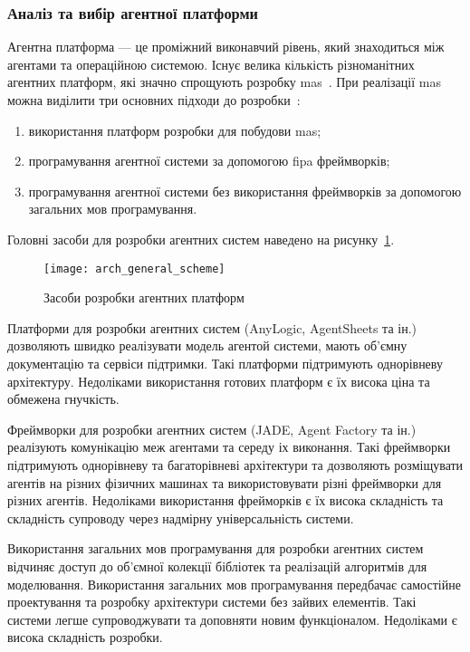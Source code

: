 \subsubsection{Аналіз та вибір агентної платформи}
Агентна платформа --- це проміжний виконавчий рівень, який знаходиться між агентами та операційною системою.
Існує велика кількість різноманітних агентних платформ, які значно спрощують розробку \acrshort{mas}~\cite{Kravari2015}.
При реалізації \acrshort{mas} можна виділити три основних підходи до розробки~\cite{Zhou2010}:
\begin{enumerate}[label={\arabic*)}]
	\item використання платформ розробки для побудови \acrshort{mas};
	\item програмування агентної системи за допомогою \acrshort{fipa} фреймворків;
	\item програмування агентної системи без використання фреймворків за допомогою загальних мов програмування.
\end{enumerate}

Головні засоби для розробки агентних систем наведено на рисунку~\ref{fig:arch_general_scheme}.

\begin{figure}[H]
	\centering
	\texttt{[image: arch\_general\_scheme]}
	\caption{Засоби розробки агентних платформ}
	\label{fig:arch_general_scheme}
\end{figure} 


Платформи для розробки агентних систем (AnyLogic, AgentSheets та ін.) дозволяють швидко реалізувати модель агентой системи, мають об'ємну документацію та сервіси підтримки. Такі платформи підтримують однорівневу архітектуру. Недоліками використання готових платформ є їх висока ціна та обмежена гнучкість.

Фреймворки для розробки агентних систем (JADE, Agent Factory та ін.) реалізують комунікацію меж агентами та середу іх виконання. Такі фреймворки підтримують однорівневу та багаторівневі архітектури та дозволяють розміщувати агентів на різних фізичних машинах та використовувати різні фреймворки для різних агентів. Недоліками використання фрейморків є їх висока складність та складність супроводу через надмірну універсальність системи.

Використання загальних мов програмування для розробки агентних систем відчиняє доступ до об'ємної колекції бібліотек та реалізацій алгоритмів для моделювання. Використання загальних мов програмування передбачає самостійне проектування та розробку архітектури системи без зайвих елементів. Такі системи легше супроводжувати та доповняти новим функціоналом. Недоліками є висока складність розробки.

